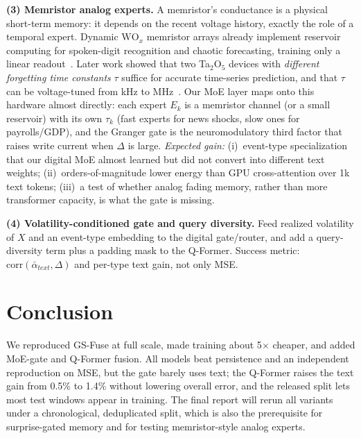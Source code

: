 \documentclass{article}
\begin{document}
\textbf{(3) Memristor analog experts.} A memristor's conductance is a physical short-term memory: it depends on the recent voltage history, exactly the role of a temporal expert. Dynamic $\mathrm{WO}_x$ memristor arrays already implement reservoir computing for spoken-digit recognition and chaotic forecasting, training only a linear readout~\cite{du2017,moon2019}. Later work showed that two Ta$_2$O$_5$ devices with \emph{different forgetting time constants} $\tau$ suffice for accurate time-series prediction, and that $\tau$ can be voltage-tuned from kHz to MHz~\cite{torok2023}. Our MoE layer maps onto this hardware almost directly: each expert $E_k$ is a memristor channel (or a small reservoir) with its own $\tau_k$ (fast experts for news shocks, slow ones for payrolls/GDP), and the Granger gate is the neuromodulatory third factor that raises write current when $\Delta$ is large. \emph{Expected gain:} (i)~event-type specialization that our digital MoE almost learned but did not convert into different text weights; (ii)~orders-of-magnitude lower energy than GPU cross-attention over 1k text tokens; (iii)~a test of whether analog fading memory, rather than more transformer capacity, is what the gate is missing.

\textbf{(4) Volatility-conditioned gate and query diversity.} Feed realized volatility of $X$ and an event-type embedding to the digital gate/router, and add a query-diversity term plus a padding mask to the Q-Former. Success metric: $\mathrm{corr}(\bar\alpha_{text},\Delta)$ and per-type text gain, not only MSE.

\section{Conclusion}
We reproduced GS-Fuse at full scale, made training about 5$\times$ cheaper, and added MoE-gate and Q-Former fusion. All models beat persistence and an independent reproduction on MSE, but the gate barely uses text; the Q-Former raises the text gain from 0.5\% to 1.4\% without lowering overall error, and the released split lets most test windows appear in training. The final report will rerun all variants under a chronological, deduplicated split, which is also the prerequisite for surprise-gated memory and for testing memristor-style analog experts.

\end{document}
